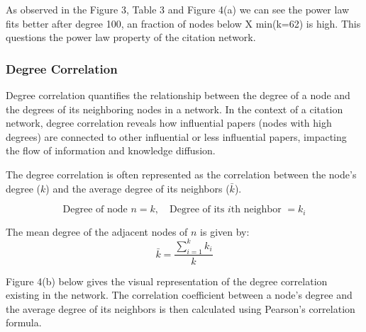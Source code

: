 \documentclass{article}
\begin{document}
As observed in the Figure 3, Table 3 and Figure 4(a) we can see the power law fits better after degree 100, an fraction of nodes below X min(k=62) is high. This questions the power law property of the citation network.

\subsubsection{Degree Correlation}
Degree correlation quantifies the relationship between the degree of a node and the degrees of its neighboring nodes in a network. In the context of a citation network, degree correlation reveals how influential papers (nodes with high degrees) are connected to other influential or less influential papers, impacting the flow of information and knowledge diffusion.

The degree correlation is often represented as the correlation between the node's degree ($k$) and the average degree of its neighbors ($\bar{k}$).

\[\text{Degree of node } n = k, \quad \text{Degree of its } i\text{th neighbor } = k_i\]

The mean degree of the adjacent nodes of $n$ is given by:
\begin{equation}
    \bar{k} = \frac{\sum_{i=1}^k k_i}{k}
    \label{eq:average_k}
\end{equation}

Figure 4(b) below gives the visual representation of the degree correlation existing in the network. The correlation coefficient between a node’s degree and the average degree of its neighbors is then calculated using Pearson’s correlation formula.
\end{document}
